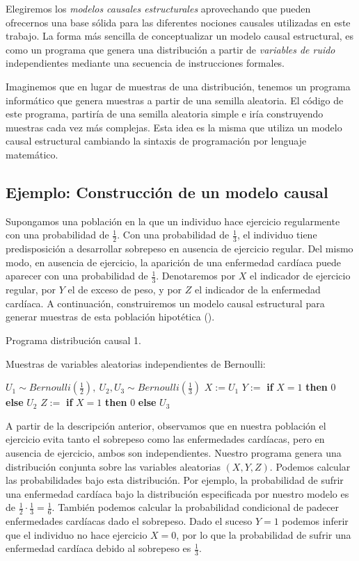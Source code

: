 \documentclass[oneside,openright,titlepage,numbers=noenddot,openany,headinclude,footinclude=true,
cleardoublepage=empty,abstractoff,BCOR=5mm,paper=a4,fontsize=12pt,main=spanish]{scrreprt}
\begin{document}
Elegiremos los \textit{modelos causales estructurales} aprovechando que pueden ofrecernos una base sólida para las diferentes nociones causales utilizadas en este trabajo. La forma más sencilla de conceptualizar un modelo causal estructural, es como un programa que genera una distribución a partir de \textit{variables de ruido} independientes mediante una secuencia de instrucciones formales. 

Imaginemos que en lugar de muestras de una distribución, tenemos un programa informático que genera muestras a partir de una semilla aleatoria. El código de este programa, partiría de una semilla aleatoria simple e iría construyendo muestras cada vez más complejas. Esta idea es la misma que utiliza un modelo causal estructural cambiando la sintaxis de programación por lenguaje matemático.

\subsection{Ejemplo: Construcción de un modelo causal} \label{subsec:sobrepeso}

Supongamos una población en la que un individuo hace ejercicio regularmente con una probabilidad de $\frac{1}{2}$. Con una probabilidad de $\frac{1}{3}$, el individuo tiene predisposición a desarrollar sobrepeso en ausencia de ejercicio regular. Del mismo modo, en ausencia de ejercicio, la aparición de una enfermedad cardíaca puede aparecer con una probabilidad de $\frac{1}{3}$. Denotaremos por $X$ el indicador de ejercicio regular, por $Y$ el de exceso de peso, y por $Z$ el indicador de la enfermedad cardíaca. A continuación, construiremos un modelo causal estructural para generar muestras de esta población hipotética (\cite{fairnesslearning2019}).

\clearpage

\begin{algorithm}[h]
\caption{Programa distribución causal 1.}
    Muestras de variables aleatorias independientes de Bernoulli:
    
    $U_1 \sim  Bernoulli\left(\frac{1}{2}\right), \ U_2,U_3 \sim  Bernoulli\left(\frac{1}{3}\right)$\;
    $X:=U_1$\;
    $Y:=$ \textbf{if} $X=1$ \textbf{then} $0$ \textbf{else} $U_2$\;
    $Z:=$ \textbf{if} $X=1$ \textbf{then} $0$ \textbf{else} $U_3$\;
    \label{alg:programa2}
\end{algorithm}

A partir de la descripción anterior, observamos que en nuestra población el ejercicio evita tanto el sobrepeso como las enfermedades cardíacas, pero en ausencia de ejercicio, ambos son independientes. Nuestro programa genera una distribución conjunta sobre las variables aleatorias $(X, Y, Z)$. Podemos calcular las probabilidades bajo esta distribución. Por ejemplo, la probabilidad de sufrir una enfermedad cardíaca bajo la distribución especificada por nuestro modelo es de $\frac{1}{2}\cdot \frac{1}{3}=\frac{1}{6}$. También podemos calcular la probabilidad condicional de padecer enfermedades cardíacas dado el sobrepeso. Dado el suceso $Y = 1$ podemos inferir que el individuo no hace ejercicio $X=0$, por lo que la probabilidad de sufrir una enfermedad cardíaca debido al sobrepeso es $\frac{1}{3}$.
\end{document}

